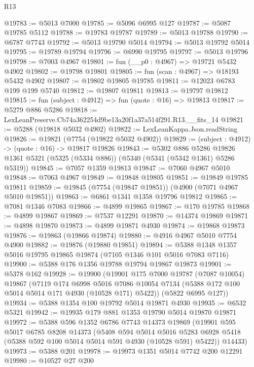 \begin{lexlean}{R13}
\begin{coremodule}
@19783 := @5013 @7000
@19785 := @5096 @6995 @127
@19787 := @5087 @19785 @5112
@19788 := @19783 @19787
@19789 := @5013 @19788
@19790 := @6787 @7743
@19792 := @5013 @19790 @5014
@19794 := @5013 @19792 @5014
@19795 := @19789 @19794
@19796 := @6990 @19795
@19797 := @5013 @19796
@19798 := @7003 @4967
@19801 := fun (__p0 : @4967) => @19721 @5432 @4902
@19802 := @19798 @19801
@19805 := fun (scan : @4967) => @18193 @5432 @4902
@19807 := @19802 @19805 @19785
@19811 := @12023 @6783 @199 @199 @5740
@19812 := @19807 @19811
@19813 := @19797 @19812
@19815 := fun (subject : @4912) => fun (quote : @16) => @19813
@19817 := @5279 @886 @5286
@19818 := LexLeanPreserve.Cb74a362254d9be13a20f1a37a514f291.R13.__fits_14
@19821 := @5288 (@19818 @5032 @4902)
@19822 := LexLeanKappa.Json.readString
@19826 := @19821 (@7754 (@19822 @5032 @4902))
@19829 := (subject : @4912) -> (quote : @16) -> @19817 @19826
@19843 := @5302
    @886
    @5286
    @19826
    @1361
    @5321
    (@5325 (@5334 @886))
    (@5340 (@5341 (@5342 @1361) @5286 @5319))
@19845 := @7057 @1359 @19813
@19847 := @7060 @4967 @5010
@19848 := @7063 @4967
@19849 := @19848 @19805
@19851 := @19849 @19785 @19811
@19859 := @19845 (@7754 (@19847 @19851)) (@4900 (@7071 @4967 @5010 @19851))
@19863 := @6861 @1341 @1358 @19796 @19812
@19865 := @7081 @1346 @7083
@19866 := @4899 @19865
@19867 := @170 @19785
@19868 := @4899 @19867
@19869 := @7537 @12291
@19870 := @14374 @19869
@19871 := @4898 @19870
@19873 := @4899 @19871 @4930
@19874 := @19868 @19873
@19876 := @19863 (@19866 @19874)
@19880 := @4916 @4967 @5010 @7754 @4900
@19882 := @19876 (@19880 @19851)
@19894 := @5388 @1348 @1357 @5016 @19795 @19865 @19874 (@7105 @1346 @101 @5016 @7083 @7116)
@19900 := @5388 @176 @1356 @19788 @19794 @19867 @19873
@19901 := @5378 @162
@19928 := @19900
    (@19901
      @175
      @7000
      @19787
      (@7087 @10054)
      @19867
      (@7119
        @174
        @6998
        @5016
        @7086
        @10054
        @7134
        (@5388 @172 @100 @5014 @5014 @171 @4930 (@10528 @171) @5422))
      (@5822 @6995 @127))
@19934 := @5388 @1354 @100 @19792 @5014 @19871 @4930
@19935 := @6532 @5321
@19942 := @19935 @179 @881 @1353 @19790 @5014 @19870 @19871
@19972 := @5388
    @596
    @1352
    @6786
    @7743
    @14373
    @19869
    (@19901
      @595
      @5017
      @6785
      @8208
      @14373
      (@5408
        @594
        @5014
        @5016
        @5283
        @6928
        @5418
        (@5388 @592 @100 @5014 @5014 @591 @4930 (@10528 @591) @5422))
      @14433)
@19973 := @5388 @201
@19978 := @19973 @1351 @5014 @7742 @200 @12291
@19980 := @10527 @27 @200

\end{coremodule}
\end{lexlean}
